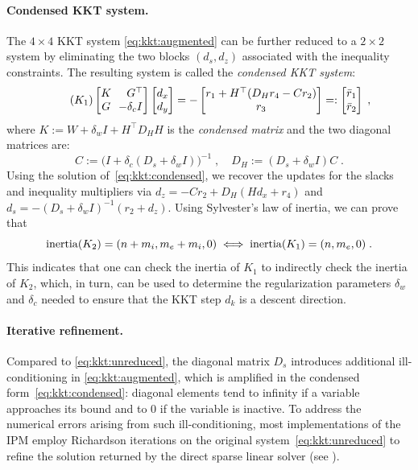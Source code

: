 \paragraph{Condensed KKT system.}
The $4 \times 4$ KKT system \eqref{eq:kkt:augmented} can be further
reduced to a $2 \times 2$ system by eliminating the two blocks
$(d_s, d_z)$ associated with the inequality constraints.
The resulting system is called the \emph{condensed KKT system}:
\begin{equation}
  \label{eq:kkt:condensed}
  \tag{$K_1$}
  \setlength\arraycolsep{3pt}
  \begin{bmatrix}
    K & \phantom{-} G^\top \\
    G & -\delta_c I
  \end{bmatrix}
  \begin{bmatrix}
    d_x \\ d_y
  \end{bmatrix}
  =
  -
  \begin{bmatrix}
    r_1 + H^\top(D_H r_4 - C r_2) \\ r_3
  \end{bmatrix}
  =:
  \begin{bmatrix}
    \bar{r}_1 \\ \bar{r}_2
  \end{bmatrix}
   \; ,
\end{equation}
where $K := W + \delta_w I  + H^\top D_H H$ is the \emph{condensed matrix}
and the two diagonal matrices are:
\begin{equation}
  C := \big(I + \delta_c(D_s + \delta_w I)\big)^{-1} \; , \quad
  D_H := (D_s + \delta_w I) C \; .
\end{equation}
Using the solution of~\eqref{eq:kkt:condensed},
we recover the updates for the slacks and inequality multipliers via
$d_z = -C r_2 + D_H(H d_x + r_4)$ and $d_s = -(D_s + \delta_w I)^{-1}(r_2 + d_z)$.
Using Sylvester's law of inertia, we can prove that
\begin{equation}
  \label{eq:ipm:inertia}
  \operatorname{inertia}(K_2) = (n+m_i, m_e+m_i, 0) \iff
  \operatorname{inertia}(K_1) = (n, m_e, 0) \;.
\end{equation}
This indicates that one can check the inertia of $K_1$ to indirectly check the inertia of $K_2$, which, in turn, can be used to determine the regularization parameters $\delta_w$ and $\delta_c$ needed to ensure that the KKT step $d_k$ is a descent direction.

\paragraph{Iterative refinement.}
Compared to \eqref{eq:kkt:unreduced}, the diagonal matrix $D_s$ introduces additional ill-conditioning in \eqref{eq:kkt:augmented}, which is amplified in the condensed form~\eqref{eq:kkt:condensed}: diagonal elements tend to infinity if a variable approaches its bound and to $0$ if the variable is inactive.
To address the numerical errors arising from such ill-conditioning, most implementations of the IPM employ Richardson iterations on the original system~\eqref{eq:kkt:unreduced} to refine the solution returned by the direct sparse linear solver (see \cite[Section 3.10]{wachter2006implementation}).

